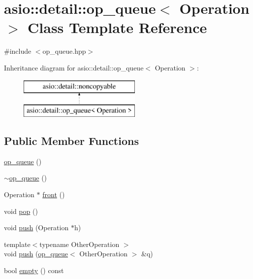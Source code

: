 \hypertarget{classasio_1_1detail_1_1op__queue}{}\section{asio\+:\+:detail\+:\+:op\+\_\+queue$<$ Operation $>$ Class Template Reference}
\label{classasio_1_1detail_1_1op__queue}


{\ttfamily \#include $<$op\+\_\+queue.\+hpp$>$}

Inheritance diagram for asio\+:\+:detail\+:\+:op\+\_\+queue$<$ Operation $>$\+:\begin{figure}[H]
\begin{center}
\leavevmode
\includegraphics[height=2.000000cm]{classasio_1_1detail_1_1op__queue}
\end{center}
\end{figure}
\subsection*{Public Member Functions}
\begin{DoxyCompactItemize}
\item 
\hyperlink{classasio_1_1detail_1_1op__queue_a4e839d0d0521075933dc596f942ac9e0}{op\+\_\+queue} ()
\item 
\hyperlink{classasio_1_1detail_1_1op__queue_a7c8578e462ad95cdfb3c744cf00d3729}{$\sim$op\+\_\+queue} ()
\item 
Operation $\ast$ \hyperlink{classasio_1_1detail_1_1op__queue_aa4d2c28466a70665b6096f8644a6c418}{front} ()
\item 
void \hyperlink{classasio_1_1detail_1_1op__queue_aefd5c63d0ed89c2c3be0f93c5bc6ae3f}{pop} ()
\item 
void \hyperlink{classasio_1_1detail_1_1op__queue_a8678ef4406ead00be2753d860fc83a26}{push} (Operation $\ast$h)
\item 
{\footnotesize template$<$typename Other\+Operation $>$ }\\void \hyperlink{classasio_1_1detail_1_1op__queue_acf5c7649fb185eb4b79d86a0a20d3451}{push} (\hyperlink{classasio_1_1detail_1_1op__queue}{op\+\_\+queue}$<$ Other\+Operation $>$ \&q)
\item 
bool \hyperlink{classasio_1_1detail_1_1op__queue_a1b4cf7482cb5a955e42daf79a2954a09}{empty} () const 
\end{DoxyCompactItemize}
